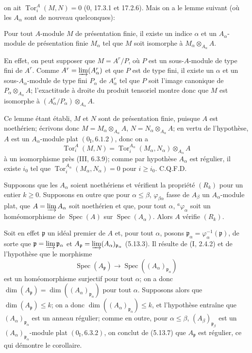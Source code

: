 
on ait $\operatorname{Tor}^A_i(M,N)=0$ (0, 17.3.1 et 17.2.6). Mais on a le
lemme suivant (où les $A_\alpha$ sont de nouveau quelconques):

\begin{lemma}[5.13.7.1]
\label{IV.2.s5.13.7.1-fr}
Pour tout $A$-module $M$ de présentation finie, il existe un indice $\alpha$
et un $A_\alpha$-module de présentation finie $M_\alpha$ tel que $M$ soit
isomorphe à $M_\alpha\otimes_{A_\alpha}A$.
\end{lemma}

En effet, on peut supposer que $M=A^r/P$, où $P$ est un sous-$A$-module de
type fini de $A^r$. Comme $A^r=\varinjlim(A_\alpha^r)$ et que $P$ est de type
fini, il existe un $\alpha$ et un sous-$A_\alpha$-module de type fini
$P_\alpha$ de $A_\alpha^r$ tel que $P$ soit l'image canonique de
$P_\alpha\otimes_{A_\alpha}A$; l'exactitude à droite du produit tensoriel
montre donc que $M$ est isomorphe à
$(A_\alpha^r/P_\alpha)\otimes_{A_\alpha}A$.

Ce lemme étant établi, $M$ et $N$ sont de présentation finie, puisque $A$ est
noethérien; écrivons donc
$M=M_\alpha\otimes_{A_\alpha}A$,
$N=N_\alpha\otimes_{A_\alpha}A$; en vertu de l'hypothèse, $A$ est un
$A_\alpha$-module plat $(0_{\mathrm I}, 6.1.2)$, donc on a
\[
\operatorname{Tor}^A_i(M,N)
=\operatorname{Tor}^{A_\alpha}_i(M_\alpha,N_\alpha)
 \otimes_{A_\alpha}A
\]
à un isomorphisme près (III, 6.3.9); comme par hypothèse $A_\alpha$ est
régulier, il existe $i_0$ tel que
$\operatorname{Tor}^{A_\alpha}_i(M_\alpha,N_\alpha)=0$ pour $i\geq i_0$.
C.Q.F.D.

\begin{corollary}[5.13.8]
\label{IV.2.s5.13.8-fr}
Supposons que les $A_\alpha$ soient noethériens et vérifient la propriété
$(R_k)$ pour un entier $k\geq0$. Supposons en outre que pour
$\alpha\leq\beta$, $\varphi_{\beta\alpha}$ fasse de $A_\beta$ un
$A_\alpha$-module plat, que $A=\varinjlim A_\alpha$ soit noethérien et que,
pour tout $\alpha$, ${}^a\varphi_\alpha$ soit un homéomorphisme de
$\operatorname{Spec}(A)$ sur $\operatorname{Spec}(A_\alpha)$. Alors $A$
vérifie $(R_k)$.
\end{corollary}

Soit en effet $\mathfrak p$ un idéal premier de $A$ et, pour tout $\alpha$,
posons $\mathfrak p_\alpha=\varphi_\alpha^{-1}(\mathfrak p)$, de sorte que
$\mathfrak p=\varinjlim\mathfrak p_\alpha$ et
$A_{\mathfrak p}=\varinjlim(A_\alpha)_{\mathfrak p_\alpha}$ (5.13.3). Il
résulte de (I, 2.4.2) et de l'hypothèse que le morphisme
\[
\operatorname{Spec}(A_{\mathfrak p})
\longrightarrow\operatorname{Spec}((A_\alpha)_{\mathfrak p_\alpha})
\]
est un homéomorphisme surjectif pour tout $\alpha$; on a donc
$\dim(A_{\mathfrak p})=\dim((A_\alpha)_{\mathfrak p_\alpha})$ pour tout
$\alpha$. Supposons alors que $\dim(A_{\mathfrak p})\leq k$; on a donc
$\dim((A_\alpha)_{\mathfrak p_\alpha})\leq k$, et l'hypothèse entraîne que
$(A_\alpha)_{\mathfrak p_\alpha}$ est un anneau régulier; comme en outre, pour
$\alpha\leq\beta$, $(A_\beta)_{\mathfrak p_\beta}$ est un
$(A_\alpha)_{\mathfrak p_\alpha}$-module plat $(0_{\mathrm I}, 6.3.2)$, on
conclut de (5.13.7) que $A_{\mathfrak p}$ est régulier, ce qui démontre le
corollaire.

